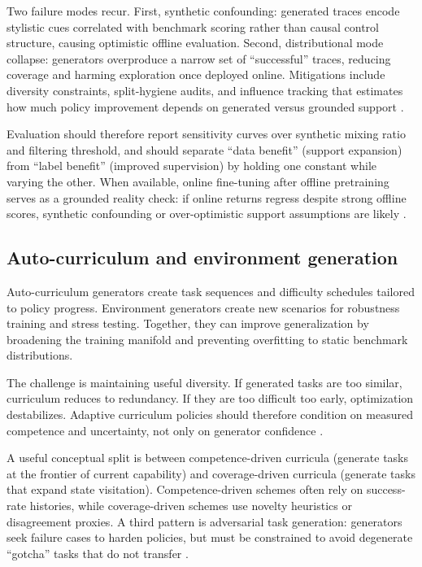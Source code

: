 ﻿\documentclass[conference]{IEEEtran}
\begin{document}
Two failure modes recur. First, synthetic confounding: generated traces encode stylistic cues correlated with benchmark scoring rather than causal control structure, causing optimistic offline evaluation. Second, distributional mode collapse: generators overproduce a narrow set of ``successful'' traces, reducing coverage and harming exploration once deployed online. Mitigations include diversity constraints, split-hygiene audits, and influence tracking that estimates how much policy improvement depends on generated versus grounded support \cite{arxiv_p_2505_18098,arxiv_p_2602_02137,doi_p_10_14778_3685800_3685913}.

Evaluation should therefore report sensitivity curves over synthetic mixing ratio and filtering threshold, and should separate ``data benefit'' (support expansion) from ``label benefit'' (improved supervision) by holding one constant while varying the other. When available, online fine-tuning after offline pretraining serves as a grounded reality check: if online returns regress despite strong offline scores, synthetic confounding or over-optimistic support assumptions are likely \cite{arxiv_p_2310_20587,arxiv_p_2601_08107,arxiv_p_2602_14468}.

\subsection{Auto-curriculum and environment generation}
Auto-curriculum generators create task sequences and difficulty schedules tailored to policy progress. Environment generators create new scenarios for robustness training and stress testing. Together, they can improve generalization by broadening the training manifold and preventing overfitting to static benchmark distributions.

The challenge is maintaining useful diversity. If generated tasks are too similar, curriculum reduces to redundancy. If they are too difficult too early, optimization destabilizes. Adaptive curriculum policies should therefore condition on measured competence and uncertainty, not only on generator confidence \cite{arxiv_p_2512_24653,arxiv_p_2601_18225,arxiv_p_2601_20802}.

A useful conceptual split is between competence-driven curricula (generate tasks at the frontier of current capability) and coverage-driven curricula (generate tasks that expand state visitation). Competence-driven schemes often rely on success-rate histories, while coverage-driven schemes use novelty heuristics or disagreement proxies. A third pattern is adversarial task generation: generators seek failure cases to harden policies, but must be constrained to avoid degenerate ``gotcha'' tasks that do not transfer \cite{arxiv_p_2512_16848,arxiv_p_2602_07906,arxiv_p_2601_16486,arxiv_p_2512_24653}.
\end{document}

